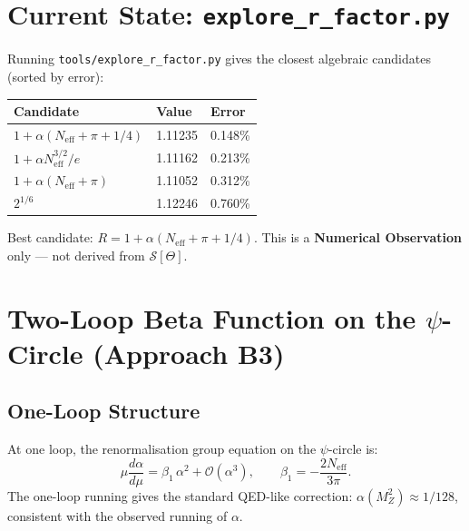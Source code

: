 \documentclass[11pt,a4paper]{article}
\theoremstyle{remark}
\begin{document}
\section{Current State: \texttt{explore\_r\_factor.py}}
\label{sec:current}

Running \texttt{tools/explore\_r\_factor.py} gives the closest algebraic
candidates (sorted by error):

\begin{center}
\begin{tabular}{lll}
\hline
\textbf{Candidate} & \textbf{Value} & \textbf{Error} \\
\hline
$1 + \alpha(N_{\mathrm{eff}} + \pi + 1/4)$ & 1.11235 & 0.148\% \\
$1 + \alpha N_{\mathrm{eff}}^{3/2}/e$ & 1.11162 & 0.213\% \\
$1 + \alpha(N_{\mathrm{eff}} + \pi)$ & 1.11052 & 0.312\% \\
$2^{1/6}$ & 1.12246 & 0.760\% \\
\hline
\end{tabular}
\end{center}

Best candidate: $R = 1 + \alpha(N_{\mathrm{eff}} + \pi + 1/4)$.
This is a \textbf{Numerical Observation} only — not derived from $\mathcal{S}[\Theta]$.

\section{Two-Loop Beta Function on the $\psi$-Circle (Approach B3)}
\label{sec:twoloop}

\subsection{One-Loop Structure}

At one loop, the renormalisation group equation on the $\psi$-circle is:
\begin{equation}
  \mu\frac{d\alpha}{d\mu} = \beta_1\,\alpha^2 + \mathcal{O}(\alpha^3),
  \qquad \beta_1 = -\frac{2N_{\mathrm{eff}}}{3\pi}.
  \label{eq:one_loop_beta}
\end{equation}
The one-loop running gives the standard QED-like correction:
$\alpha(M_Z^2) \approx 1/128$, consistent with the observed running of $\alpha$.
\end{document}
